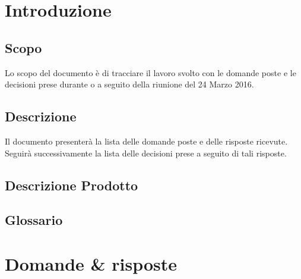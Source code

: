 \documentclass[12pt,a4paper]{article}
\newcommand{\dataCreazione}{24 Marzo 2016}
\begin{document}
\tableofcontents
\listoftables
\newpage

\section{Introduzione}

\subsection{Scopo}
Lo scopo del documento è di tracciare il lavoro svolto con le domande poste e le decisioni prese durante o a seguito della riunione del \dataCreazione.

\subsection{Descrizione}
Il documento presenterà la lista delle domande poste e delle risposte ricevute. Seguirà successivamente la lista delle decisioni prese a seguito di tali risposte.

\subsection{Descrizione Prodotto}
\descrizioneProdotto

\subsection{Glossario}
\glossarioPrint

\newpage


\section{Domande \& risposte}
\end{document}
